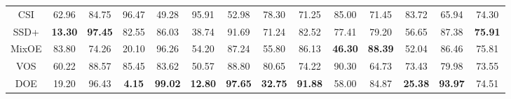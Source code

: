 \documentclass{article} \usepackage{iclr2022_conference,times}
\begin{document}
\begin{table}[t]
{\begin{tabular}{c|cccccccccccc|c}
CSI         & 62.96 & 84.75 & 96.47 & 49.28 & 95.91 & 52.98 & 78.30 & 71.25 & 85.00 & 71.45 & 83.72 & 65.94 & 74.30 \\
SSD+        & \textbf{13.30} & \textbf{97.45} & 82.55 & 86.03 & 38.74 & 91.69 & 71.24 & 82.52 & 77.41 & 79.20 & 56.65 & 87.38 & \textbf{75.91} \\
MixOE       & 83.80 & 74.26 & 20.10 & 96.26 & 54.20 & 87.24 & 55.80 & 86.13 & \textbf{46.30} & \textbf{88.39} & 52.04 & 86.46 & 75.81 \\
VOS         & 60.22 & 88.57 & 85.45 & 83.62 & 50.57 & 88.80 & 80.65 & 74.22 & 90.30 & 64.73 & 73.43 & 79.98 & 73.55 \\
\hline
DOE         & 19.20 & 96.43 &  \textbf{4.15} & \textbf{99.02} & \textbf{12.80} & \textbf{97.65} & \textbf{32.75} & \textbf{91.88} & 58.00 & 84.87 & \textbf{25.38} & \textbf{93.97} & 74.51 \\
\bottomrule[1.5pt]   
\end{tabular}}
\end{table}
\end{document}
